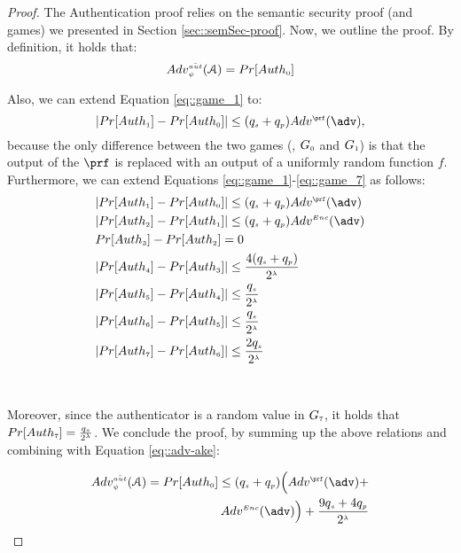 \begin{proof}
The Authentication proof relies on the semantic security proof (and games) we presented in Section \ref{sec::semSec-proof}.  Now, we outline the proof.  By definition, it holds that:
%
 \begin{equation}\label{eq::adv-ake}
Adv_{\scriptscriptstyle \psi}^{\scriptscriptstyle \bar {aut}}(\mathcal{A})=Pr[Auth_{\scriptscriptstyle  0}]
\end{equation}


Also, we can extend Equation \ref{eq::game_1} to:
%
\begin{equation*}
|Pr[Auth_{\sss  1}]-Pr[Auth_{\sss  0}]| \leq (q_{\sss s}+q_{\sss p})Adv^{\sss\prf}(\adv),
\end{equation*}
%
 because the only difference between the two games (\ie, $G_{\scriptscriptstyle  0}$ and $G_{\scriptscriptstyle  1}$) is that the output of the $\prf$ is replaced with an output of a uniformly random function $f$.  
%
 Furthermore, we can extend Equations \ref{eq::game_1}-\ref{eq::game_7} as follows: 
 \begin{equation*}
 \begin{split}
  &  |Pr[Auth_{\sss  1}]-Pr[Auth_{\sss  0}]| \leq (q_{\sss s}+q_{\sss p}) Adv^{\sss \prf}(\adv) \\ 
 &  |Pr[Auth_{\sss  2}]-Pr[Auth_{\sss 1}]| \leq (q_{\sss s}+q_{\sss p}) Adv^{\sss Enc}(\adv) \\ 
 & Pr[Auth_{\sss  3}]-Pr[Auth_{\sss  2}]=0\\
 & |Pr[Auth_{\sss  4}]-Pr[Auth_{\sss  3}]|\leq \frac{4(q_{\sss  s}+q_{\sss  p})}{2^{\sss \lambda}}\\
 & |Pr[Auth_{\sss  5}]-Pr[Auth_{\sss  4}]|\leq \frac{q_{\sss  s}}{2^{\sss \lambda}}\\
 & |Pr[Auth_{\sss  6}]-Pr[Auth_{\sss  5}]|\leq \frac{q_{\sss  s}}{2^{\sss \lambda}}\\
 & |Pr[Auth_{\sss  7}]-Pr[Auth_{\sss  6}]|\leq \frac{2q_{\sss  s}}{2^{\sss \lambda}}
\end{split}
\end{equation*}

\

 Moreover, since the authenticator is a random value in $G_{\scriptscriptstyle 7}$, it holds that $Pr[Auth_{\scriptscriptstyle 7}]=\frac{q_{\scriptscriptstyle  s}}{2^{\scriptscriptstyle \lambda}}$. We conclude the proof, by summing up the above relations and combining with Equation \ref{eq::adv-ake}: 
 
  \begin{equation}
  \begin{split}
 Adv_{\sss \psi}^{\sss \bar {aut}}(\A) = Pr[Auth_{\sss  0}] \leq (q_{\sss s} + q_{\sss p})\Big(Adv^{\sss\prf}(\adv)+\\ Adv^{\sss Enc}(\adv)\Big)+\frac{9q_{\sss  s}+4q_{\sss  p}}{2^{\sss \lambda}}%
 \end{split}
 \end{equation}
 

\end{proof}
